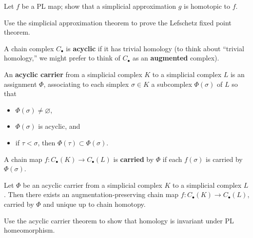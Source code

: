 \documentclass[12pt]{pset}
\begin{document}
\begin{problem}
  Let $f$ be a PL map; show that a simplicial approximation $g$ is
  homotopic to $f$.
\end{problem}

\begin{problem}
  Use the simplicial approximation theorem to prove
  the Lefschetz fixed point theorem.
\end{problem}



\begin{definition*}
  A chain complex $C_\bullet$ is \textbf{acyclic} if it has trivial
  homology (to think about ``trivial homology,'' we might prefer to
  think of $C_\bullet$ as an \textbf{augmented} complex).

  An \textbf{acyclic carrier} from a simplicial complex $K$ to a
  simplicial complex $L$ is an assignment $\Phi$, associating to each
  simplex $\sigma \in K$ a subcomplex $\Phi(\sigma)$ of $L$ so that
  \begin{itemize}
  \item $\Phi(\sigma) \neq \varnothing$,
  \item $\Phi(\sigma)$ is acyclic, and
  \item if $\tau < \sigma$, then $\Phi(\tau) \subset \Phi(\sigma)$.
  \end{itemize}
  A chain map $f : C_\bullet(K) \to C_\bullet(L)$ is \textbf{carried} by
  $\Phi$ if each $f(\sigma)$ is carried by $\Phi(\sigma)$.
\end{definition*}

\begin{theorem*}
  Let $\Phi$ be an acyclic carrier from a simplicial complex $K$ to a
  simplicial complex $L$.  Then there exists an
  augmentation-preserving chain map $f : C_\bullet(K) \to C_\bullet(L)$,
  carried by $\Phi$ and unique up to chain homotopy.
\end{theorem*}

\begin{problem}
  Use the acyclic carrier theorem to show that homology is invariant under PL homeomorphism.
\end{problem}
\end{document}
